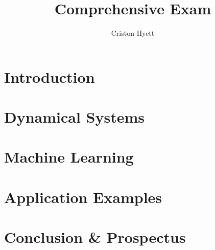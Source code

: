 \documentclass{article}
\title{Comprehensive Exam}
\author{Criston Hyett}
\begin{document}
\maketitle

\section{Introduction}


\section{Dynamical Systems}

\section{Machine Learning}

\section{Application Examples}

\section{Conclusion \& Prospectus}
\end{document}
